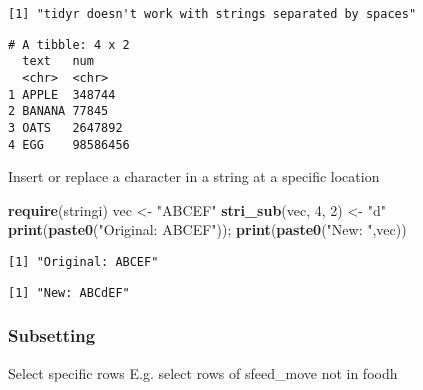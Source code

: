 \documentclass[10,portrait]{article}
\newenvironment{Shaded}{\begin{snugshade}}{\end{snugshade}}
\newcommand{\KeywordTok}[1]{\textcolor[rgb]{0.13,0.29,0.53}{\textbf{#1}}}
\newcommand{\DataTypeTok}[1]{\textcolor[rgb]{0.13,0.29,0.53}{#1}}
\newcommand{\DecValTok}[1]{\textcolor[rgb]{0.00,0.00,0.81}{#1}}
\newcommand{\StringTok}[1]{\textcolor[rgb]{0.31,0.60,0.02}{#1}}
\newcommand{\OperatorTok}[1]{\textcolor[rgb]{0.81,0.36,0.00}{\textbf{#1}}}
\newcommand{\NormalTok}[1]{#1}
\begin{document}
\begin{verbatim}
[1] "tidyr doesn't work with strings separated by spaces"
\end{verbatim}

\begin{Shaded}
\end{Shaded}

\begin{verbatim}
# A tibble: 4 x 2
  text   num     
  <chr>  <chr>   
1 APPLE  348744  
2 BANANA 77845   
3 OATS   2647892 
4 EGG    98586456
\end{verbatim}

Insert or replace a character in a string at a specific location

\begin{Shaded}
\begin{Highlighting}[]
\KeywordTok{require}\NormalTok{(stringi)}
\NormalTok{vec <-}\StringTok{ "ABCEF"}
\KeywordTok{stri_sub}\NormalTok{(vec, }\DecValTok{4}\NormalTok{, }\DecValTok{2}\NormalTok{) <-}\StringTok{ "d"} 
\KeywordTok{print}\NormalTok{(}\KeywordTok{paste0}\NormalTok{(}\StringTok{"Original: ABCEF"}\NormalTok{)); }\KeywordTok{print}\NormalTok{(}\KeywordTok{paste0}\NormalTok{(}\StringTok{"New: "}\NormalTok{,vec))}
\end{Highlighting}
\end{Shaded}

\begin{verbatim}
[1] "Original: ABCEF"
\end{verbatim}

\begin{verbatim}
[1] "New: ABCdEF"
\end{verbatim}

\subsubsection{Subsetting}\label{subsetting}

Select specific rows E.g. select rows of sfeed\_move not in foodh
\end{document}
